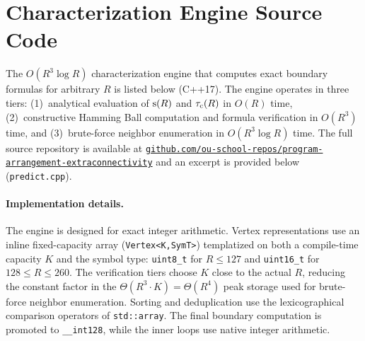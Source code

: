 \section{Characterization Engine Source Code}\label{app:engine}

The $O(R^3 \log R)$ characterization engine that computes exact boundary
formulas for arbitrary $R$ is listed below (C++17). The engine operates in three
tiers: (1)~analytical evaluation of $\mathrm{s}(R)$ and $\tau_{\mathrm{c}}(R)$ in $O(R)$ time,
(2)~constructive Hamming Ball computation and formula verification in $O(R^3)$
time, and (3)~brute-force neighbor enumeration in $O(R^3 \log R)$ time. The full
source repository is available at
\href{https://github.com/ou-school-repos/program-arrangement-extraconnectivity}{\texttt{github.com/ou-school-repos/program-arrangement-extraconnectivity}}
and an excerpt is provided below (\texttt{predict.cpp}).

\paragraph{Implementation details.}
The engine is designed for exact integer arithmetic. Vertex representations use
an inline fixed-capacity array (\texttt{Vertex<K,SymT>}) templatized on both a
compile-time capacity $K$ and the symbol type: \texttt{uint8\_t} for $R \le 127$
and \texttt{uint16\_t} for $128 \le R \le 260$. The verification tiers choose
$K$ close to the actual $R$, reducing the constant factor in the $\Theta(R^3
\cdot K)=\Theta(R^4)$ peak storage used for brute-force neighbor enumeration.
Sorting and deduplication use the lexicographical comparison operators of
\texttt{std::array}. The final boundary computation is promoted to
\texttt{\_\_int128}, while the inner loops use native integer arithmetic.




